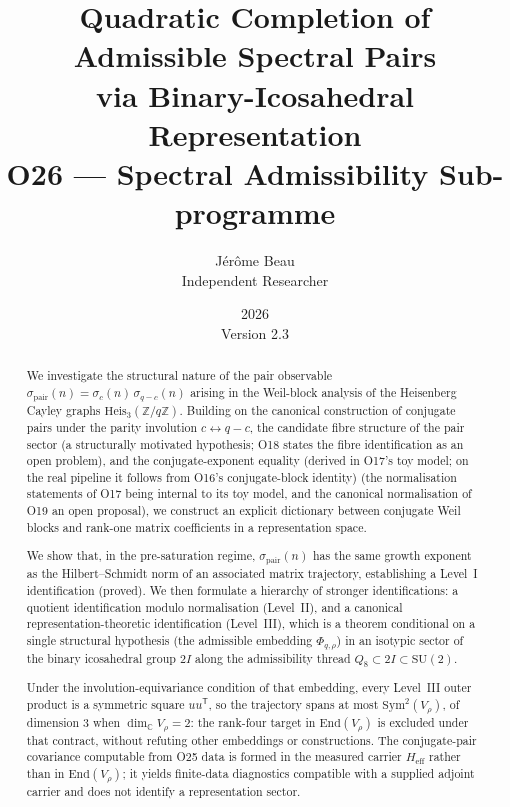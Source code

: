 \documentclass[12pt,a4paper]{article}
\title{Quadratic Completion of Admissible Spectral Pairs\\
via Binary-Icosahedral Representation\\[0.5em]
\large O26 --- Spectral Admissibility Sub-programme}
\author{J\'er\^ome Beau\\
\small Independent Researcher}
\date{2026\\[2pt]\small Version 2.3}
\theoremstyle{definition}
\theoremstyle{remark}
\begin{document}
  \maketitle

  \begin{abstract}
    We investigate the structural nature of the pair observable
    $\sigma_{\mathrm{pair}}(n) = \sigma_c(n)\,\sigma_{q-c}(n)$ arising in the
    Weil-block analysis of the Heisenberg Cayley graphs
    $\mathrm{Heis}_3(\mathbb{Z}/q\mathbb{Z})$.
    Building on the canonical construction of conjugate pairs under the parity
    involution $c \leftrightarrow q-c$, the candidate fibre structure of the pair
    sector (a structurally motivated hypothesis; O18 states the
    fibre identification as an open problem), and the conjugate-exponent equality (derived in O17's toy model; on the real pipeline it follows from
    O16's conjugate-block identity)
    (the normalisation statements of O17 being internal to its toy model, and the canonical
    normalisation of O19 an open proposal),
    we construct an explicit dictionary between conjugate Weil blocks and rank-one
    matrix coefficients in a representation space.

    We show that, in the pre-saturation regime, $\sigma_{\mathrm{pair}}(n)$ has the
    same growth exponent as the Hilbert--Schmidt norm of an associated matrix
    trajectory, establishing a Level~I identification (proved).
    We then formulate a hierarchy of stronger identifications:
    a quotient identification modulo normalisation (Level~II), and a canonical
    representation-theoretic identification (Level~III), which is a theorem
    conditional on a single structural hypothesis (the admissible embedding
    $\Phi_{q,\rho}$) in an isotypic sector of the binary icosahedral group $2I$
    along the admissibility thread $Q_8 \subset 2I \subset \mathrm{SU}(2)$.

    Under the involution-equivariance condition of that embedding, every Level~III outer
    product is a symmetric square $uu^{\mathsf T}$, so the trajectory spans at most
    $\mathrm{Sym}^2(V_\rho)$, of dimension $3$ when $\dim_{\mathbb{C}} V_\rho = 2$: the
    rank-four target in $\mathrm{End}(V_\rho)$ is excluded under that contract, without
    refuting other embeddings or constructions.
    The conjugate-pair covariance computable from O25 data is formed in the measured carrier
    $H_{\mathrm{eff}}$ rather than in $\mathrm{End}(V_\rho)$; it yields finite-data diagnostics
    compatible with a supplied adjoint carrier and does not identify a representation sector.
  \end{abstract}
\end{document}
